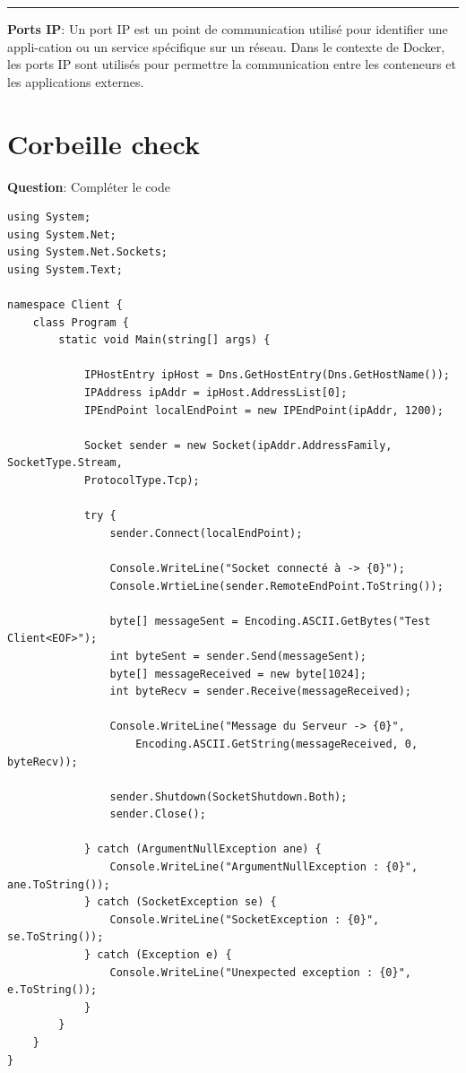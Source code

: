 \begin{center}
\rule{5cm}{0.4pt}
\end{center}

\vspace{0.5cm}

\noindent \textbf{Ports IP}:
\noindent Un port IP est un point de communication utilisé pour identifier une appli-cation ou un service spécifique sur un réseau. Dans le contexte de Docker, les ports IP sont utilisés pour permettre la communication entre les conteneurs et les applications externes.
    
\newpage

\section*{Corbeille check}

\noindent \textbf{Question}: Compléter le code

\begin{verbatim}
using System;
using System.Net;
using System.Net.Sockets;
using System.Text;

namespace Client {
	class Program {
		static void Main(string[] args) {

			IPHostEntry ipHost = Dns.GetHostEntry(Dns.GetHostName());
			IPAddress ipAddr = ipHost.AddressList[0];
			IPEndPoint localEndPoint = new IPEndPoint(ipAddr, 1200);

			Socket sender = new Socket(ipAddr.AddressFamily, SocketType.Stream,
			ProtocolType.Tcp);

			try {
				sender.Connect(localEndPoint);

				Console.WriteLine("Socket connecté à -> {0}");
				Console.WrtieLine(sender.RemoteEndPoint.ToString());

				byte[] messageSent = Encoding.ASCII.GetBytes("Test Client<EOF>");
				int byteSent = sender.Send(messageSent);
				byte[] messageReceived = new byte[1024];
				int byteRecv = sender.Receive(messageReceived);

				Console.WriteLine("Message du Serveur -> {0}",
					Encoding.ASCII.GetString(messageReceived, 0, byteRecv));

				sender.Shutdown(SocketShutdown.Both);
				sender.Close();

			} catch (ArgumentNullException ane) {
				Console.WriteLine("ArgumentNullException : {0}", ane.ToString());
			} catch (SocketException se) {
				Console.WriteLine("SocketException : {0}", se.ToString());
			} catch (Exception e) {
				Console.WriteLine("Unexpected exception : {0}", e.ToString());
			}
		}
	}
}
\end{verbatim}

